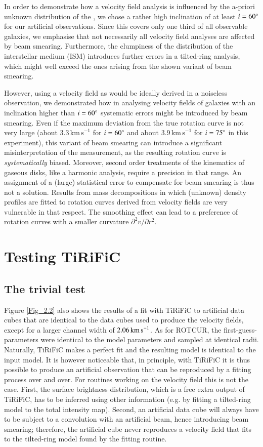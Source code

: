 \documentclass[oldversion]{aa}
\renewcommand{\deg}{\hbox{$^\circ$}}
\newcommand{\cng}[1]{{#1}}
\newcommand{\cngs}[1]{{#1}}
\begin{document}
\cng{In order to demonstrate how a velocity field analysis is influenced by the a-priori unknown distribution of the \ion{H}{i}, we chose a rather high inclination of at least $i=60\deg$ for our artificial observations. Since this covers only one third of all observable galaxies, we emphasise that not necessarily all velocity field analyses are affected by beam smearing. Furthermore, the clumpiness of the distribution of the interstellar medium (ISM) introduces further errors in a tilted-ring analysis, which might well exceed the ones arising from the shown variant of beam smearing.}

\cng{However\cngs{, using a velocity field as would be ideally derived in a noiseless observation, }we demonstrated how \cngs{in analysing} velocity fields of galaxies with an inclination higher than $i=60\deg$ systematic errors might be introduced by beam smearing.}
Even if the maximum deviation from the true rotation curve is not very
large (\cng{about $3.3\,{\mathrm{km\,s}}^{-1}$ for $i=60\deg$ and}
about $3.9\,{\mathrm{km\,s}}^{-1}$ for $i=75\deg$ in this experiment),
this variant of beam smearing can introduce a significant
misinterpretation of the measurement, as the resulting rotation curve
is \emph{systematically} biased. \cng{Moreover, second order treatments of the kinematics of gaseous disks, like a harmonic analysis, require a precision in that range.} An assignment of a (large)
statistical error to compensate for beam smearing is thus not a
solution. Results from mass decompositions in which (unknown) density
profiles are fitted to rotation curves derived from velocity fields
are very vulnerable in that respect. The smoothing effect can lead to
a preference of rotation curves with a smaller curvature
${\partial^2 v}/{\partial r^2}$.
\section{Testing TiRiFiC}
\label{Sect_2.4}
\subsection{The trivial test} \label{Sect_2.4.1}
\cng{Figure \ref{Fig_2.2} also shows the results of a
fit with TiRiFiC to artificial data cubes that are identical to the
data cubes used to produce the velocity fields, except for a larger
channel width of $2.06\,{\rm km\,s}^{-1}$. As for ROTCUR, the
first-guess-parameters were identical to the model
parameters and sampled at identical radii. Naturally, TiRiFiC makes a perfect fit and the resulting
model is identical to the input model. It is however noticeable that, in
principle, with TiRiFiC it is thus possible to produce an artificial
observation that can be reproduced by a fitting process over and
over. For routines working on the velocity field this is not the
case. First, the surface brightness distribution, which is a free
extra output of TiRiFiC, has to be inferred using other information
(e.g. by fitting a tilted-ring model to the total intensity map). Second, an artificial
data cube will always have to be subject to a convolution with an
artificial beam, hence introducing beam smearing; therefore, the artificial cube never reproduces a velocity field that fits
to the tilted-ring model found by the fitting routine.}
\end{document}
